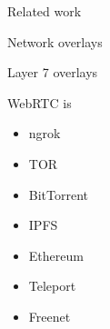 \begin{frame}[fragile]{Related work}
\begin{block}{Network overlays}
\begin{block}{Layer 7 overlays}
\begin{block}{WebRTC is}
\begin{itemize}
  \begin{itemize}
  \tightlist
  \item
    uses relays
  \end{itemize}
\item
  ngrok
\item
  TOR
\item
  BitTorrent
\item
  IPFS
\item
  Ethereum
\item
  Teleport
\item
  Freenet
\end{itemize}
\end{block}
\end{block}
\end{block}
\end{frame}

